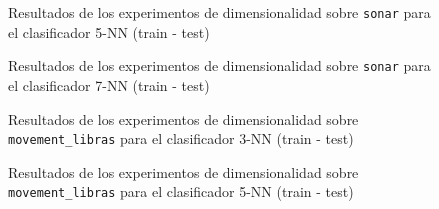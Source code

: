 \begin{figure}[h]
\caption{Resultados de los experimentos de dimensionalidad sobre \texttt{sonar} para el clasificador 5-NN (train - test)} \label{results:dim:sonar:5nn}
\end{figure}

\begin{figure}[h]
\caption{Resultados de los experimentos de dimensionalidad sobre \texttt{sonar} para el clasificador 7-NN (train - test)} \label{results:dim:sonar:7nn}
\end{figure}

\begin{figure}[h]
\caption{Resultados de los experimentos de dimensionalidad sobre \texttt{movement\_libras} para el clasificador 3-NN (train - test)} \label{results:dim:libras:3nn}
\end{figure}

\begin{figure}[h]
\caption{Resultados de los experimentos de dimensionalidad sobre \texttt{movement\_libras} para el clasificador 5-NN (train - test)} \label{results:dim:libras:5nn}
\end{figure}

